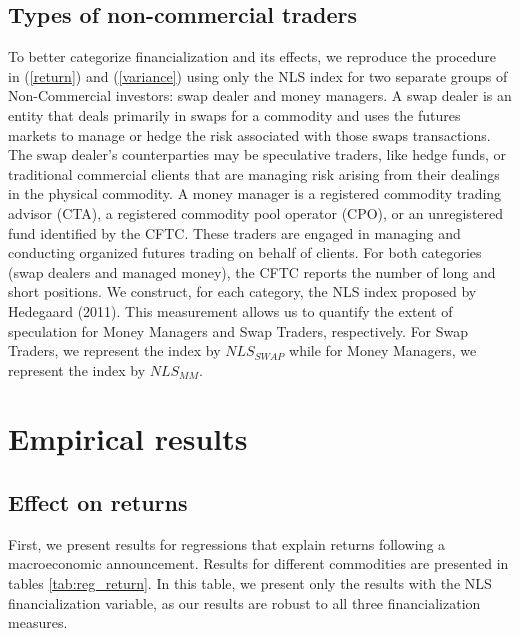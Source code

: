 \documentclass[12pt]{article}
\begin{document}
\subsection{Types of non-commercial traders}
To better categorize financialization and its effects, we reproduce the procedure in (\ref{return})  and (\ref{variance}) using only the NLS index for two separate groups of Non-Commercial investors: swap dealer and money managers. A swap dealer is an entity that deals primarily in swaps for a commodity and uses the futures markets to manage or hedge the risk associated with those swaps transactions. The swap dealer’s counterparties may be speculative traders, like hedge funds, or traditional commercial clients that are managing risk arising from their dealings in the physical commodity. A money manager is a registered commodity trading advisor (CTA), a registered commodity pool operator (CPO), or an unregistered fund identified by the CFTC. These traders are engaged in managing and conducting organized futures trading on behalf of clients. For both categories (swap dealers and managed money), the CFTC reports the number of long and short positions. We construct, for each category, the NLS index proposed by Hedegaard (2011). This measurement allows us to quantify the extent of speculation for Money Managers and Swap Traders, respectively. For Swap Traders, we represent the index by $NLS_{SWAP}$ while for Money Managers, we represent the index by $NLS_{MM}$.



\section{Empirical results} \label{sec:result}



\subsection{Effect on returns}
First, we present results for regressions that explain returns following a macroeconomic announcement. Results for different commodities are presented in tables \ref{tab:reg_return}. In this table, we present only the results with the NLS financialization variable, as our results are robust to all three financialization measures.
\end{document}
